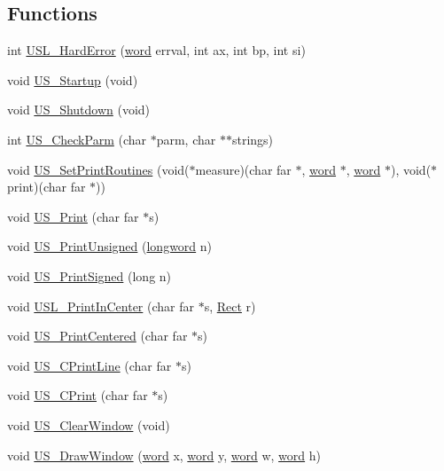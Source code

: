 \subsection*{Functions}
\begin{DoxyCompactItemize}
\item 
int \hyperlink{ID__US__1_8C_a326264bdc562d493badf85dfba63a495}{USL\_\-HardError} (\hyperlink{ID__HEAD_8H_abad51e07ab6d26bec9f1f786c8d65bcd}{word} errval, int ax, int bp, int si)
\item 
void \hyperlink{ID__US__1_8C_a25cccf3faa98e384b1f88c33a0a4e09f}{US\_\-Startup} (void)
\item 
void \hyperlink{ID__US__1_8C_aea2712f28a63f8aca70c66df1f532ecc}{US\_\-Shutdown} (void)
\item 
int \hyperlink{ID__US__1_8C_ab779824eaa9432170162847f92aff6f9}{US\_\-CheckParm} (char $\ast$parm, char $\ast$$\ast$strings)
\item 
void \hyperlink{ID__US__1_8C_aed7467cd936e319d9378cf958bd02236}{US\_\-SetPrintRoutines} (void($\ast$measure)(char far $\ast$, \hyperlink{ID__HEAD_8H_abad51e07ab6d26bec9f1f786c8d65bcd}{word} $\ast$, \hyperlink{ID__HEAD_8H_abad51e07ab6d26bec9f1f786c8d65bcd}{word} $\ast$), void($\ast$print)(char far $\ast$))
\item 
void \hyperlink{ID__US__1_8C_ae158b4a99ff8fe4bca4517925b6b429c}{US\_\-Print} (char far $\ast$s)
\item 
void \hyperlink{ID__US__1_8C_aaaf7bf10a561ab0338f8b3742c408b86}{US\_\-PrintUnsigned} (\hyperlink{ID__HEAD_8H_a8a9a7dd50c6fdb45dcdf0eb929479663}{longword} n)
\item 
void \hyperlink{ID__US__1_8C_adcea441d26d8338b8eb2cd44c3c4a105}{US\_\-PrintSigned} (long n)
\item 
void \hyperlink{ID__US__1_8C_abd887f54352061deb6deb73c7ff9399e}{USL\_\-PrintInCenter} (char far $\ast$s, \hyperlink{structRect}{Rect} r)
\item 
void \hyperlink{ID__US__1_8C_a524fd911a8a3ceedd0a3efe9b5f76830}{US\_\-PrintCentered} (char far $\ast$s)
\item 
void \hyperlink{ID__US__1_8C_ad8fa7aed3bed622bff4925586de5e0dd}{US\_\-CPrintLine} (char far $\ast$s)
\item 
void \hyperlink{ID__US__1_8C_a45d1b7ebde4b4cbfd5a34b3b0134ee8b}{US\_\-CPrint} (char far $\ast$s)
\item 
void \hyperlink{ID__US__1_8C_a9987548b83195953febc41d3a3bc86f2}{US\_\-ClearWindow} (void)
\item 
void \hyperlink{ID__US__1_8C_a06cee19903ed682701ef040c7f1b1ffa}{US\_\-DrawWindow} (\hyperlink{ID__HEAD_8H_abad51e07ab6d26bec9f1f786c8d65bcd}{word} x, \hyperlink{ID__HEAD_8H_abad51e07ab6d26bec9f1f786c8d65bcd}{word} y, \hyperlink{ID__HEAD_8H_abad51e07ab6d26bec9f1f786c8d65bcd}{word} w, \hyperlink{ID__HEAD_8H_abad51e07ab6d26bec9f1f786c8d65bcd}{word} h)
$$
\end{DoxyCompactItemize}
